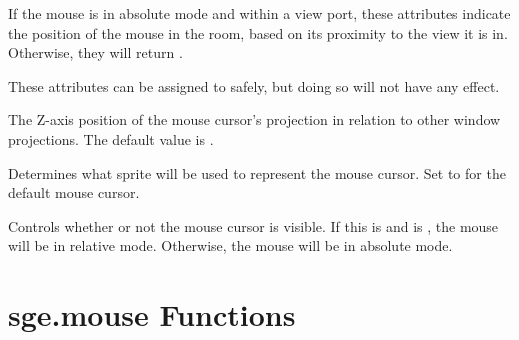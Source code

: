 \documentclass[letterpaper,10pt,english]{sphinxmanual}
\begin{document}
\begin{fulllineitems}
\label{mouse:sge.mouse.sge.game.mouse.x}\label{mouse:sge.mouse.sge.game.mouse.y}
If the mouse is in absolute mode and within a view port, these
attributes indicate the
position of the mouse in the room, based on its proximity to the view
it is in.  Otherwise, they will return .

These attributes can be assigned to safely, but doing so will not
have any effect.

\end{fulllineitems}


\begin{fulllineitems}
\label{mouse:sge.mouse.sge.game.mouse.z}
The Z-axis position of the mouse cursor's projection in relation to
other window projections.  The default value is .

\end{fulllineitems}


\begin{fulllineitems}
\label{mouse:sge.mouse.sge.game.mouse.sprite}
Determines what sprite will be used to represent the mouse cursor.
Set to  for the default mouse cursor.

\end{fulllineitems}


\begin{fulllineitems}
\label{mouse:sge.mouse.sge.game.mouse.visible}
Controls whether or not the mouse cursor is visible.  If this is
 and  is , the
mouse will be in relative mode.  Otherwise, the mouse will be in
absolute mode.

\end{fulllineitems}



\section{sge.mouse Functions}
\label{mouse:sge-mouse-functions}
\end{document}
